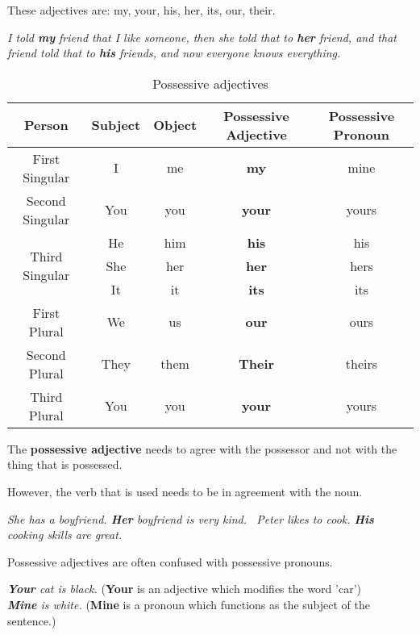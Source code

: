\documentclass[hidelinks,10pt,a4paper]{article}
\begin{document}
These adjectives are: my, your, his, her, its, our, their.

\begin{center}
	\textit{I told \textbf{my} friend that I like someone, then she told that to \textbf{her} friend, and that friend told that to \textbf{his} friends, and now everyone knows everything. }
\end{center}

\begin{table}[h]
\begin{center}
\begin{tabular}{|c|c|c|c|c|}
	\hline
	\textbf{Person} & \textbf{Subject} & \textbf{Object} & \textbf{Possessive Adjective} & \textbf{Possessive Pronoun} \\ \hline
	First Singular  & I & me & \textbf{my} & mine \\ \hline
	Second Singular & You & you & \textbf{your} & yours \\ \hline
	\multirow{3}{*}{Third Singular} & He & him & \textbf{his} & his \\ \hline
	 & She & her & \textbf{her} & hers \\ \hline
	 & It & it & \textbf{its} & its \\ \hline
	First Plural  & We & us & \textbf{our} & ours \\ \hline
	Second Plural & They & them & \textbf{Their} & theirs \\ \hline
	Third Plural & You & you & \textbf{your} & yours \\ \hline
\end{tabular}
\end{center}
\caption{Possessive adjectives} \label{tab:posa1}
\end{table}

The \textbf{possessive adjective} needs to agree with the possessor and not with the thing that is possessed.

However, the verb that is used needs to be in agreement with the noun.

\begin{center}
	\textit{She has a boyfriend. \textbf{Her} boyfriend is very kind. \
	Peter likes to cook. \textbf{His} cooking skills are great.}
\end{center}

Possessive adjectives are often confused with possessive pronouns.

\begin{center}
	\textit{\textbf{Your} cat is black.} (\textbf{Your} is an adjective which modifies the word 'car') \\
	\textit{\textbf{Mine} is white.} (\textbf{Mine} is a pronoun which functions as the subject of the sentence.)
\end{center}
\end{document}
